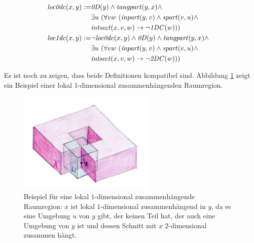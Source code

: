     \begin{dfn}
        \begin{align*}
            \Gloczerodc(x,y) := &\GzeroD(y) \land \Gtangpart(y,x) \land
                                \\
                                &\exists u\ (\forall v w\ (\Ginpart(y,v) \land \Gspart(v,u) \land
                                \\
                                &\Gintersect(x,v,w) \to \neg \GoneDC(w)))
                                \\
            \Gloconedc(x,y) := &\neg \Gloczerodc(x,y) \land \GzeroD(y) \land \Gtangpart(y,x) \land
                                \\
                                &\exists u\ (\forall v w\ (\Ginpart(y,v) \land \Gspart(v,u) \land
                                \\
                                &\Gintersect(x,v,w) \to \neg \GtwoDC(w)))
        \end{align*}

    \end{dfn}
%
    Es ist noch zu zeigen, dass beide Definitionen kompatibel sind.
    Abbildung \ref{fig:loc1dc} zeigt ein Beispiel einer lokal $1$-dimensional zusammenhängenden Raumregion.

    \begin{figure}[ht]
            \centering
            \includegraphics[width=0.6\textwidth]{bearbeitet-22-04-25/loc1dc.png}
            \caption[Beispiel für eine lokal $1$-dimensional zusammenhängende Raumregion]{Beispiel für eine lokal $1$-dimensional zusammenhängende Raumregion: $x$ ist lokal $1$-dimensional zusammenhängend in $y$, da es eine Umgebung $u$ von $y$ gibt, der keinen Teil hat, der auch eine Umgebung von $y$ ist und dessen Schnitt mit $x$ $2$-dimensional zusammen hängt.}
            \label{fig:loc1dc}
    \end{figure}
